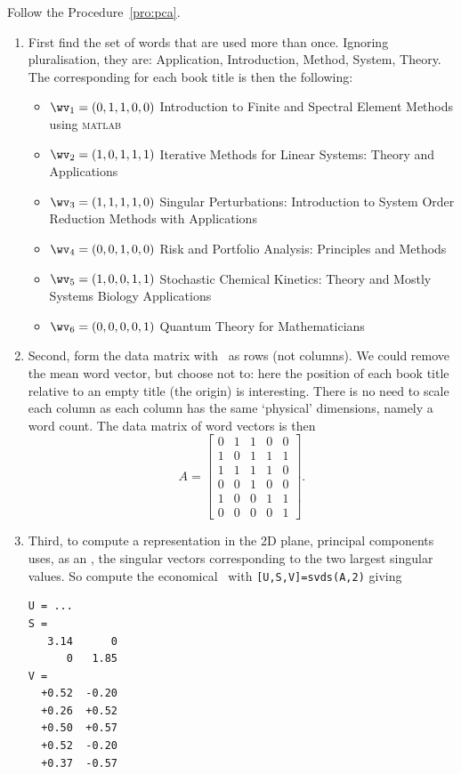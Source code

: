 Follow the  Procedure~\ref{pro:pca}.
\begin{enumerate}
\item 
First find the set of words that are used more than once.
Ignoring pluralisation, they are: 
Application, Introduction, Method, System, Theory.
The corresponding  for each book title is then the following:
\begin{itemize}
\item \(\wv_1=(0,1,1,0,0)\) Introduction to Finite and Spectral Element Methods using \textsc{matlab}
\item \(\wv_2=(1,0,1,1,1)\) Iterative Methods for Linear Systems: Theory and Applications 
\item \(\wv_3=(1,1,1,1,0)\) Singular Perturbations: Introduction to System Order Reduction Methods with Applications 
\item \(\wv_4=(0,0,1,0,0)\) Risk and Portfolio Analysis: Principles and Methods 
\item \(\wv_5=(1,0,0,1,1)\) Stochastic Chemical Kinetics: Theory and Mostly Systems Biology Applications
\item \(\wv_6=(0,0,0,0,1)\) Quantum Theory for Mathematicians 
\end{itemize}

\item Second, form the data matrix with \hlist{}\ as rows (not columns).
We could remove the mean word vector, but choose not to: here the position of each book title relative to an empty title (the origin) is interesting.
There is no need to scale each column as each column has the same `physical' dimensions, namely a word count.
The data matrix of word vectors is then
\begin{equation*}
A=\begin{bmatrix} 0&1&1&0&0
\\1&0&1&1&1
\\1&1&1&1&0
\\0&0&1&0&0
\\1&0&0&1&1
\\0&0&0&0&1 \end{bmatrix}.
\end{equation*}
\setbox\ajrqrbox\hbox{}%
\marginpar{\usebox{\ajrqrbox\\[2ex]}}%


\item Third, to compute a representation in the 2D plane, principal components uses, as an , the singular vectors corresponding to the two largest singular values.  
So compute the economical \svd\ with \verb|[U,S,V]=svds(A,2)| giving \twodp
\begin{verbatim}
U = ...
S =
   3.14      0
      0   1.85
V =
  +0.52  -0.20
  +0.26  +0.52
  +0.50  +0.57
  +0.52  -0.20
  +0.37  -0.57
\end{verbatim}


\end{enumerate}
